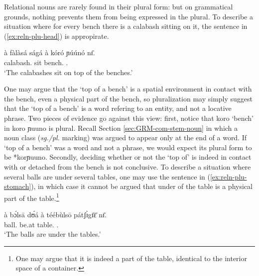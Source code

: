 \begin{exe}
\begin{exe}
\begin{exe}
{\begin{exe}
\begin{exe}
\begin{exe}
\begin{exe}
\begin{exe}
\begin{exe}


Relational nouns
are rarely found in their plural form: but on grammatical grounds, nothing
prevents them from being expressed in the plural. 
To describe a situation where  for every bench there is a calabash sitting on
it, 
the sentence in (\ref{ex:reln-plu-head}) is appropirate.


\ea\label{ex:reln-plu-head}
\gll à fàlàsá ságá à kóró ɲúúnó nɪ̄.\\
{\art} calabash.{\pl}  sit {\art} bench.{\pl}  {\reln .\pl} {\postp}\\
\glt `The calabashes sit on top of the benches.' 
\z

One may argue that the `top of a bench' is a spatial environment  in contact
with the bench, even a physical part of the bench, so pluralization may simply
suggest that the   `top of a bench' is a word refering to an entity,  and not a
locative phrase. Two pieces of evidence go against this view: first,  notice
that {\sls koro} `bench'  in {\sls koro ɲuuno} is plural.  Recall Section
\ref{sec:GRM-com-stem-noun} in which a noun class ({\it sg./pl.} marking) was
argued to  appear only at the end of a word. If  `top of a bench' was a word and
not a phrase, we would expect its plural form to be  *{\sls korɲuuno}. 
Secondly, 
deciding whether or not the `top of' is indeed in contact with or detached from
the bench is not conclusive. To describe a situation where several balls are
under several tables, one may use the sentence in (\ref{ex:reln-plu-stomach}), 
in which case it cannot be argued that  under of the table is a physical part of
the table.\footnote{One may argue that it is indeed a part of the table,
identical to the interior space of a container.}

\ea\label{ex:reln-plu-stomach}
\gll à bɔ́lsā dʊ́á à téébùlsō pátʃɪ̀gɪ̄ɛ̄ nɪ̄.\\
{\art} ball.{\pl}  be.at {\art}   table.{\pl}  {\reln .\pl} {\postp}\\
\glt `The balls are under the tables.'
\z




\end{exe}
\end{exe}
\end{exe}
\end{exe}
\end{exe}
\end{exe}}
\end{exe}
\end{exe}
\end{exe}
